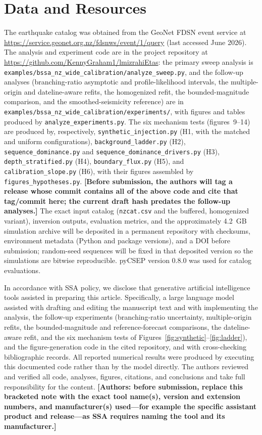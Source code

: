 \documentclass[12pt]{article}
\begin{document}
\section*{Data and Resources}

The earthquake catalog was obtained from the GeoNet FDSN event service at
\url{https://service.geonet.org.nz/fdsnws/event/1/query} (last accessed June
2026). The analysis and experiment code are in the project repository at
\url{https://github.com/KennyGraham1/lmizrahiEtas}: the primary sweep analysis is
\nolinkurl{examples/bssa_nz_wide_calibration/analyze_sweep.py}, and the follow-up
analyses (branching-ratio asymptotic and profile-likelihood intervals, the
multiple-origin and dateline-aware refits, the homogenized refit, the
bounded-magnitude comparison, and the smoothed-seismicity reference) are in
\nolinkurl{examples/bssa_nz_wide_calibration/experiments/}, with figures and
tables produced by \nolinkurl{analyze_experiments.py}. The six mechanism tests
(figures~9--14) are produced by, respectively,
\nolinkurl{synthetic_injection.py} (H1, with the matched and uniform
configurations), \nolinkurl{background_ladder.py} (H2),
\nolinkurl{sequence_dominance.py} and \nolinkurl{sequence_dominance_drivers.py}
(H3), \nolinkurl{depth_stratified.py} (H4), \nolinkurl{boundary_flux.py} (H5),
and \nolinkurl{calibration_slope.py} (H6), with their figures assembled by
\nolinkurl{figures_hypotheses.py}. \textbf{[Before
submission, the authors will tag a release whose commit contains all of the
above code and cite that tag/commit here; the current draft hash predates the
follow-up analyses.]} The exact input catalog (\nolinkurl{nzcat.csv} and the
buffered, homogenized variant), inversion outputs, evaluation metrics, and the
approximately 4.2~GB simulation archive will be deposited in a permanent
repository with checksums, environment metadata (Python and package versions),
and a DOI before submission; random-seed sequences will be fixed in that
deposited version so the simulations are bitwise reproducible. pyCSEP version
0.8.0 was used for catalog evaluations.

In accordance with SSA policy, we disclose that generative artificial
intelligence tools assisted in preparing this article. Specifically, a large
language model assisted with drafting and editing the manuscript text and with
implementing the analysis, the follow-up experiments (branching-ratio
uncertainty, multiple-origin refits, the bounded-magnitude and reference-forecast
comparisons, the dateline-aware refit, and the six mechanism tests of
Figures~\ref{fig:synthetic}--\ref{fig:ladder}), and the figure-generation code in
the cited repository, and with cross-checking bibliographic records. All reported
numerical results were produced by executing this documented code rather than by
the model directly. The authors reviewed and verified all code, analyses,
figures, citations, and conclusions and take full responsibility for the content.
\textbf{[Authors: before submission, replace this bracketed note with the exact
tool name(s), version and extension numbers, and manufacturer(s) used---for
example the specific assistant product and release---as SSA requires naming the
tool and its manufacturer.]}
\end{document}
